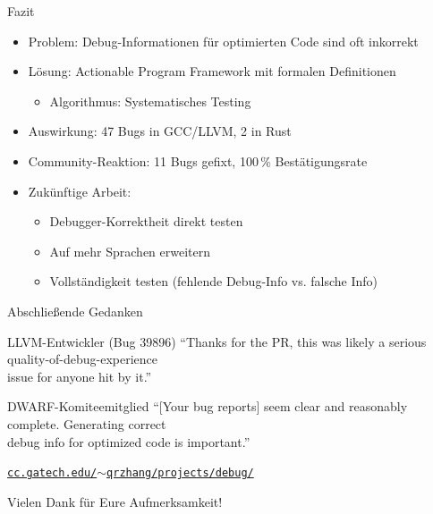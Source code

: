 ﻿\documentclass{beamer}
\begin{document}
\begin{frame}{Fazit}
  \begin{itemize}
    \item Problem: Debug-Informationen f\"ur optimierten Code sind oft inkorrekt
    \item L\"osung: Actionable Program Framework mit formalen Definitionen
      \begin{itemize}
        \item Algorithmus: Systematisches Testing
      \end{itemize}
    \item Auswirkung: 47 Bugs in GCC/LLVM, 2 in Rust
    \item Community-Reaktion: 11 Bugs gefixt, 100\,\% Best\"atigungsrate
    \item Zuk\"unftige Arbeit:
      \begin{itemize}
        \item Debugger-Korrektheit direkt testen
        \item Auf mehr Sprachen erweitern
        \item Vollst\"andigkeit testen (fehlende Debug-Info vs. falsche Info)
      \end{itemize}
  \end{itemize}
\end{frame}


\begin{frame}{Abschlie\ss{}ende Gedanken}
  \begin{block}{LLVM-Entwickler (Bug 39896)}
    ``Thanks for the PR, this was likely a serious quality-of-debug-experience \\
    issue for anyone hit by it.''
  \end{block}
  \vspace{0.3cm}
  \begin{block}{DWARF-Komiteemitglied}
    ``[Your bug reports] seem clear and reasonably complete. Generating correct \\
    debug info for optimized code is important.''
  \end{block}
  \vspace{0.3cm}
  \begin{center}
    \href{https://www.cc.gatech.edu/~qrzhang/projects/debug/debug.html}{\texttt{cc.gatech.edu/$\sim$qrzhang/projects/debug/}}
  \end{center}
\end{frame}

\begin{frame}
  \begin{center}
    \LARGE{Vielen Dank f\"ur Eure Aufmerksamkeit!}
  \end{center}
\end{frame}
\end{document}
